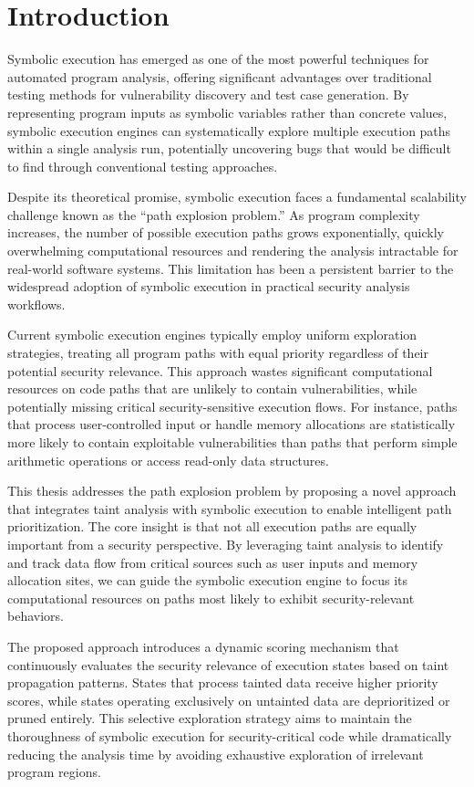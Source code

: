 \chapter{Introduction}

Symbolic execution has emerged as one of the most powerful techniques for automated program analysis, offering significant advantages over traditional testing methods for vulnerability discovery and test case generation. By representing program inputs as symbolic variables rather than concrete values, symbolic execution engines can systematically explore multiple execution paths within a single analysis run, potentially uncovering bugs that would be difficult to find through conventional testing approaches.

Despite its theoretical promise, symbolic execution faces a fundamental scalability challenge known as the ``path explosion problem.'' As program complexity increases, the number of possible execution paths grows exponentially, quickly overwhelming computational resources and rendering the analysis intractable for real-world software systems. This limitation has been a persistent barrier to the widespread adoption of symbolic execution in practical security analysis workflows.

Current symbolic execution engines typically employ uniform exploration strategies, treating all program paths with equal priority regardless of their potential security relevance. This approach wastes significant computational resources on code paths that are unlikely to contain vulnerabilities, while potentially missing critical security-sensitive execution flows. For instance, paths that process user-controlled input or handle memory allocations are statistically more likely to contain exploitable vulnerabilities than paths that perform simple arithmetic operations or access read-only data structures.

This thesis addresses the path explosion problem by proposing a novel approach that integrates taint analysis with symbolic execution to enable intelligent path prioritization. The core insight is that not all execution paths are equally important from a security perspective. By leveraging taint analysis to identify and track data flow from critical sources such as user inputs and memory allocation sites, we can guide the symbolic execution engine to focus its computational resources on paths most likely to exhibit security-relevant behaviors.

The proposed approach introduces a dynamic scoring mechanism that continuously evaluates the security relevance of execution states based on taint propagation patterns. States that process tainted data receive higher priority scores, while states operating exclusively on untainted data are deprioritized or pruned entirely. This selective exploration strategy aims to maintain the thoroughness of symbolic execution for security-critical code while dramatically reducing the analysis time by avoiding exhaustive exploration of irrelevant program regions.

